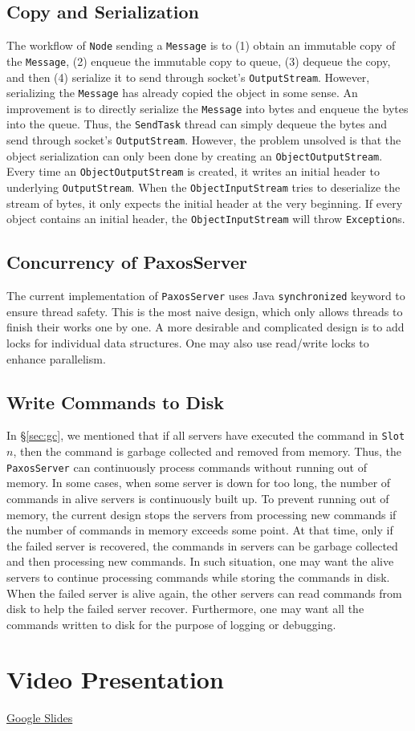 \documentclass{article}
\numberwithin{equation}{section}
\begin{document}
\subsection{Copy and Serialization}
The workflow of \verb|Node| sending a \verb|Message| is to (1) obtain an immutable copy of the \verb|Message|, (2) enqueue the immutable copy to queue, (3) dequeue the copy, and then (4) serialize it to send through socket's \verb|OutputStream|. However, serializing the \verb|Message| has already copied the object in some sense. An improvement is to directly serialize the \verb|Message| into bytes and enqueue the bytes into the queue. Thus, the \verb|SendTask| thread can simply dequeue the bytes and send through socket's \verb|OutputStream|. However, the problem unsolved is that the object serialization can only been done by creating an \verb|ObjectOutputStream|. Every time an \verb|ObjectOutputStream| is created, it writes an initial header to underlying \verb|OutputStream|. When the \verb|ObjectInputStream| tries to deserialize the stream of bytes, it only expects the initial header at the very beginning. If every object contains an initial header, the \verb|ObjectInputStream| will throw \verb|Exception|s.

\subsection{Concurrency of PaxosServer}
The current implementation of \verb|PaxosServer| uses Java \verb|synchronized| keyword to ensure thread safety. This is the most naive design, which only allows threads to finish their works one by one. A more desirable and complicated design is to add locks for individual data structures. One may also use read/write locks to enhance parallelism.

\subsection{Write Commands to Disk}
In \S\ref{sec:gc}, we mentioned that if all servers have executed the command in \verb|Slot| $n$, then the command is garbage collected and removed from memory. Thus, the \verb|PaxosServer| can continuously process commands without running out of memory. In some cases, when some server is down for too long, the number of commands in alive servers is continuously built up. To prevent running out of memory, the current design stops the servers from processing new commands if the number of commands in memory exceeds some point. At that time, only if the failed server is recovered, the commands in servers can be garbage collected and then processing new commands. In such situation, one may want the alive servers to continue processing commands while storing the commands in disk. When the failed server is alive again, the other servers can read commands from disk to help the failed server recover. Furthermore, one may want all the commands written to disk for the purpose of logging or debugging.

\section{Video Presentation}
\href{https://docs.google.com/presentation/d/1192LrW-3ghr3KgephdUU2Qoq6YV4TLW0sjI2FiVfeSE/edit?usp=sharing}{Google Slides}
\end{document}
